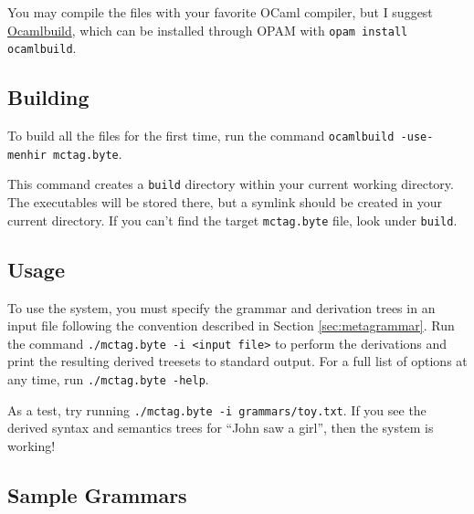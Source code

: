 \documentclass[10.5pt]{article}
\newcommand{\code}[1]{\texttt{#1}}
\begin{document}
You may compile the files with your favorite OCaml compiler, but I suggest \href{https://github.com/ocaml/ocamlbuild}{Ocamlbuild}, which can be installed through OPAM with \code{opam install ocamlbuild}.

\subsection{Building}
To build all the files for the first time, run the command \code{ocamlbuild -use-menhir mctag.byte}.

This command creates a \code{\textunderscore build} directory within your current working directory. The executables will be stored there, but a symlink should be created in your current directory. If you can't find the target \code{mctag.byte} file, look under \code{\textunderscore build}.

\subsection{Usage}
To use the system, you must specify the grammar and derivation trees in an input file following the convention described in Section \ref{sec:metagrammar}.
Run the command \code{./mctag.byte -i <input file>} to perform the derivations and print the resulting derived treesets to standard output.
For a full list of options at any time, run \code{./mctag.byte -help}.

As a test, try running \code{./mctag.byte -i grammars/toy.txt}. If you see the derived syntax and semantics trees for ``John saw a girl'', then the system is working! %

\subsection{Sample Grammars}
\end{document}
